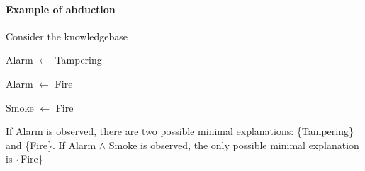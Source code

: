 \documentclass[10pt]{report}
\begin{document}
\paragraph{Example of abduction} Consider the knowledgebase
\begin{list}{}{}
	\item Alarm $\leftarrow$ Tampering
	\item Alarm $\leftarrow$ Fire
	\item Smoke $\leftarrow$ Fire
\end{list}
If Alarm is observed, there are two possible minimal explanations: \{Tampering\} and \{Fire\}. If Alarm $\wedge$ Smoke is observed, the only possible minimal explanation is \{Fire\}
\end{document}
